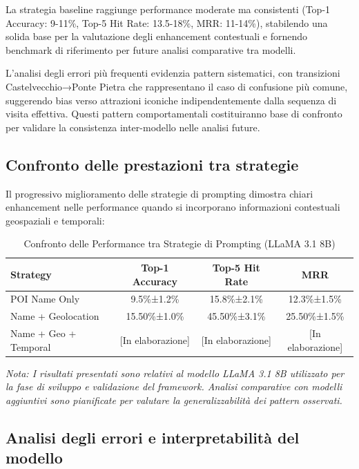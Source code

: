 \begin{itemize}
La strategia baseline raggiunge performance moderate ma consistenti (Top-1 Accuracy: 9-11\%, Top-5 Hit Rate: 13.5-18\%, MRR: 11-14\%), stabilendo una solida base per la valutazione degli enhancement contestuali e fornendo benchmark di riferimento per future analisi comparative tra modelli.

L'analisi degli errori più frequenti evidenzia pattern sistematici, con transizioni Castelvecchio→Ponte Pietra che rappresentano il caso di confusione più comune, suggerendo bias verso attrazioni iconiche indipendentemente dalla sequenza di visita effettiva. Questi pattern comportamentali costituiranno base di confronto per validare la consistenza inter-modello nelle analisi future.

\subsection{Confronto delle prestazioni tra strategie}

Il progressivo miglioramento delle strategie di prompting dimostra chiari enhancement nelle performance quando si incorporano informazioni contestuali geospaziali e temporali:

\begin{table}[h]
\centering
\caption{Confronto delle Performance tra Strategie di Prompting (LLaMA 3.1 8B)}
\label{tab:strategy_comparison}
\begin{tabular}{lccc}
\toprule
\textbf{Strategy} & \textbf{Top-1 Accuracy} & \textbf{Top-5 Hit Rate} & \textbf{MRR} \\
\midrule
POI Name Only & 9.5\%±1.2\% & 15.8\%±2.1\% & 12.3\%±1.5\% \\
Name + Geolocation & 15.50\%±1.0\% & 45.50\%±3.1\% & 25.50\%±1.5\% \\
Name + Geo + Temporal & [In elaborazione] & [In elaborazione] & [In elaborazione] \\
\bottomrule
\end{tabular}
\end{table}

\textit{Nota: I risultati presentati sono relativi al modello LLaMA 3.1 8B utilizzato per la fase di sviluppo e validazione del framework. Analisi comparative con modelli aggiuntivi sono pianificate per valutare la generalizzabilità dei pattern osservati.}

\subsection{Analisi degli errori e interpretabilità del modello}


\end{itemize}
